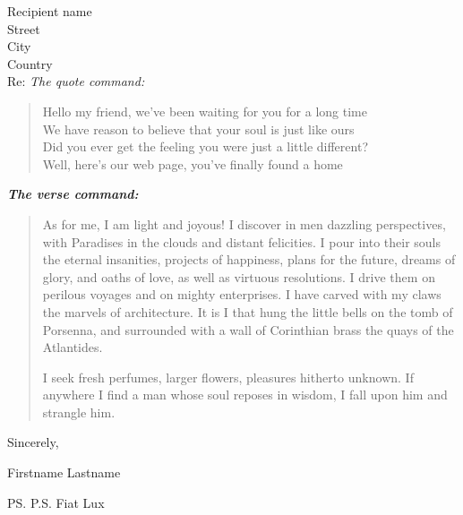 \documentclass[12pt,letterpaper]{letter} %
\def\Who{Firstname Lastname} %
\begin{document}
\begin{letter}{Recipient name \\ Street\\ City\\ Country \\ [\parskip]
Re:}
\textit{The quote command:}

\begin{quotation}
Hello my friend, we've been waiting for you for a long time \\
We have reason to believe that your soul is just like ours \\
Did you ever get the feeling you were just a little different? \\
Well, here’s our web page, you've finally found a home
\end{quotation}

\textbf{\textit{The verse command:}}

\begin{verse}
As for me, I am light and joyous! I discover in men dazzling perspectives, with Paradises in the clouds and distant felicities. I pour into their souls the eternal insanities, projects of happiness, plans for the future, dreams of glory, and oaths of love, as well as virtuous resolutions. I drive them on perilous voyages and on mighty enterprises. I have carved with my claws the marvels of architecture. It is I that hung the little bells on the tomb of Porsenna, and surrounded with a wall of Corinthian brass the quays of the Atlantides.

I seek fresh perfumes, larger flowers, pleasures hitherto unknown. If anywhere I find a man whose soul reposes in wisdom, I fall upon him and strangle him.
\end{verse}


\closing{Sincerely,}
\Who{}


\ps{P.S. Fiat Lux}



\end{letter}
\end{document}
